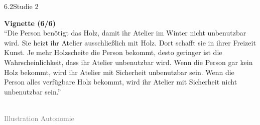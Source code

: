 \documentclass[xcolor=table,9pt,aspectratio=169]{beamer}
\begin{document}
\begin{frame}{\vspace*{10mm}6.2\hspace*{1em}Studie 2}
\begin{multicols}{2}
   \textbf{Vignette (6/6)}\\
   \medskip
   \enquote{Die Person benötigt das Holz, damit ihr Atelier im Winter nicht unbenutzbar wird. Sie heizt ihr Atelier ausschließlich mit Holz. Dort schafft sie in ihrer Freizeit Kunst. Je mehr Holzscheite die Person bekommt, desto geringer ist die Wahrscheinlichkeit, dass ihr Atelier unbenutzbar wird. Wenn die Person gar kein Holz bekommt, wird ihr Atelier mit Sicherheit unbenutzbar sein. Wenn die Person alles verfügbare Holz bekommt, wird ihr Atelier mit Sicherheit nicht unbenutzbar sein.}\\
   \vfill
   \begin{center}
      \\
      \footnotesize{\textcolor{gray}{Illustration Autonomie}}
   \end{center}
\end{multicols}
\end{frame}
\end{document}
